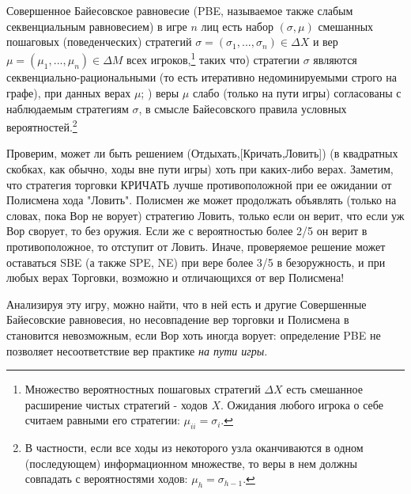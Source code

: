 \documentclass[a4paper,12pt]{article}
\begin{document}
\begin{exmp}
\begin{defn}{\rm
Совершенное Байесовское равновесие (PBE, называемое также
слабым секвенциальным равновесием) в игре $n$ лиц есть
набор $(\sigma,\mu)$ смешанных пошаговых (поведенческих)
стратегий $\sigma=(\sigma_1,...,\sigma_n)\in \Delta X$   и
вер $\mu=(\mu_1,...,\mu_n)\in \Delta M$
всех игроков,\footnote{Множество вероятностных пошаговых
стратегий $\Delta X$ есть смешанное расширение чистых
стратегий - ходов $X$. Ожидания любого игрока о себе
считаем равными его стратегии: $\mu_{ii}=\sigma_i$.}
таких что) стратегии $\sigma$ являются
секвенциально-рациональными (то есть итеративно
недоминируемыми строго на графе), при данных верах
$\mu$;
) веры $\mu$ слабо (только на пути
игры) согласованы с наблюдаемым стратегиям $\sigma$, в
смысле Байесовского правила условных
вероятностей.\footnote{ В частности, если все ходы из
некоторого узла оканчиваются в одном (последующем)
информационном множестве, то веры в нем должны совпадать с
вероятностями ходов: $\mu_{h}=\sigma_{h-1}$.} }\end{defn}



Проверим,  может ли быть решением
(Отдыхать,[Кричать,Ловить]) (в квадратных скобках, как
обычно, ходы вне пути игры) хоть при каких-либо верах.
Заметим, что стратегия торговки КРИЧАТЬ лучше
противоположной при ее ожидании от Полисмена хода "Ловить".
Полисмен же может продолжать объявлять (только на словах,
пока Вор не ворует) стратегию Ловить, только если он верит,
что если уж Вор сворует, то без оружия. Если же с
вероятностью более 2/5 он верит в противоположное, то
отступит от Ловить. Иначе, проверяемое решение может
оставаться SBE (а также SPE, NE) при вере более 3/5 в
безоружность, и при любых верах Торговки, возможно и
отличающихся от вер Полисмена!

Анализируя эту игру, можно найти, что в ней есть и другие
Совершенные Байесовские равновесия, но несовпадение вер
торговки и Полисмена в становится невозможным, если Вор
хоть иногда ворует: определение PBE не позволяет
несоответствие вер практике {\em на пути игры}.
\end{exmp}
\end{document}
